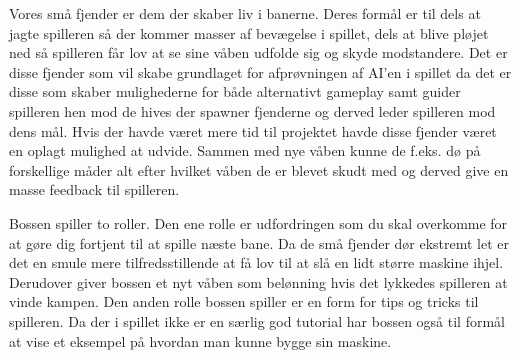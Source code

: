 Vores små fjender er dem der skaber liv i banerne. Deres formål er til dels at jagte spilleren så der kommer masser af bevægelse i spillet, dels at blive pløjet ned så spilleren får lov at se sine våben udfolde sig og skyde modstandere. Det er disse fjender som vil skabe grundlaget for afprøvningen af AI'en i spillet da det er disse som skaber mulighederne for både alternativt gameplay samt guider spilleren hen mod de hives der spawner fjenderne og derved leder spilleren mod dens mål. Hvis der havde været mere tid til projektet havde disse fjender været en oplagt mulighed at udvide. Sammen med nye våben kunne de f.eks. dø på forskellige måder alt efter hvilket våben de er blevet skudt med og derved give en masse feedback til spilleren.

Bossen spiller to roller. Den ene rolle er udfordringen som du skal overkomme for at gøre dig fortjent til at spille næste bane. Da de små fjender dør ekstremt let er det en smule mere tilfredsstillende at få lov til at slå en lidt større maskine ihjel. Derudover giver bossen et nyt våben som belønning hvis det lykkedes spilleren at vinde kampen.
Den anden rolle bossen spiller er en form for tips og tricks til spilleren. Da der i spillet ikke er en særlig god tutorial har bossen også til formål at vise et eksempel på hvordan man kunne bygge sin maskine.

